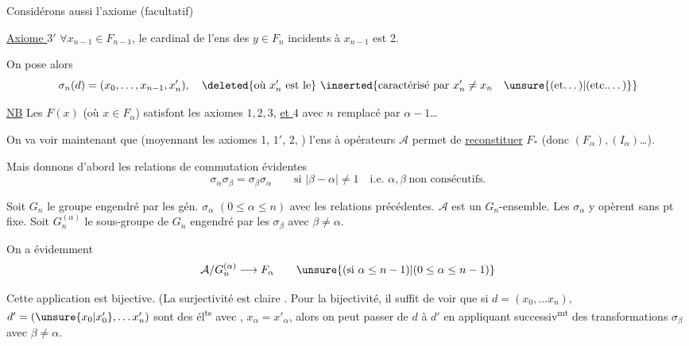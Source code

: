 Considérons aussi l'axiome (facultatif)

\uline{Axiome $3'$} $\forall x_{n-1}\in F_{n-1}$, le cardinal de l'ens des  $y\in F_n$ incidents à $x_{n-1}$ est 2.


On pose alors
\[
\sigma_n(d)=(x_0,\ldots,x_{n-1},x'_n),\quad \deleted{\text{où }x'_n\text{ est le}}\ \inserted{\text{caractérisé par }x'_n\ne x_n\quad\text{\unsure{(et\ldots)|(etc.\ldots)}}}
\]

\uline{NB} Les $F(x)$ (où $x\in F_\alpha$) satisfont les axiomes $1,2,3$, \uline{et $4$} avec $n$ remplacé par $\alpha-1$\ldots

On va voir maintenant que (moyennant les axiomes 1, $1'$, 2,  ) l'ens à opérateurs $\mathcal A$ permet de \uline{reconstituer} $F_*$ (donc $(F_\alpha),(I_\alpha)$\ldots).

  Mais donnons d'abord les relations de commutation évidentes
\[
 \sigma_\alpha\sigma_\beta=\sigma_\beta\sigma_\alpha\qquad\text{si }|\beta-\alpha|\ne1\quad\text{i.e. }\alpha,\beta\ \text{non consécutifs.}
\]

Soit $G_n$ le groupe engendré par les  gén. $\sigma_\alpha$ $(0\leq\alpha\leq n)$ avec les relations précédentes. $\mathcal A$ est un $G_n$-ensemble. Les $\sigma_\alpha$ y opèrent sans pt fixe. Soit $G_n^{(\alpha)}$  le sous-groupe de $G_n$ engendré par les $\sigma_\beta$ avec $\beta\ne\alpha$.

On a évidemment
\[
 \mathcal A/G_n^{(\alpha)}\longrightarrow F_\alpha\qquad\unsure{(\text{si }\alpha\leq n-1)|(0\leq\alpha\leq n-1)}
\]

  Cette application est bijective. (La surjectivité est claire . Pour la bijectivité, il suffit de voir que si $d=(x_0,\ldots x_n)$, $d'=(\unsure{x_0|x'_0},\ldots x'_n)$ sont des él\textsuperscript{ts} avec , $x_\alpha=x'_\alpha$, alors  on peut passer de $d$ à $d'$ en appliquant successiv\textsuperscript{mt} des transformations $\sigma_\beta$ avec $\beta\ne\alpha$.

